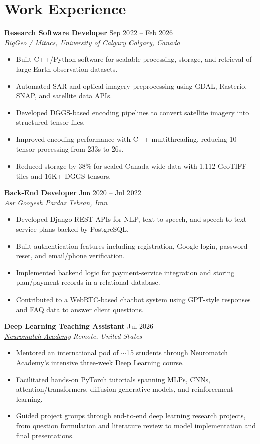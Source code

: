 \documentclass[a4paper,10pt]{article}
\newcommand{\resumeSubheading}[4]{
    \textbf{#1} \hfill #2 \\
    \textit{#3} \hfill \textit{#4}
}
\begin{document}
\section*{Work Experience}

\resumeSubheading
{Research Software Developer}
{Sep 2022 -- Feb 2026}
{\href{https://biggeo.com}{BigGeo} / \href{https://www.mitacs.ca/}{Mitacs}, University of Calgary}
{Calgary, Canada}
\begin{itemize}[leftmargin=0.25in]
    \item Built C++/Python software for scalable processing, storage, and retrieval of large Earth observation datasets.
    \item Automated SAR and optical imagery preprocessing using GDAL, Rasterio, SNAP, and satellite data APIs.
    \item Developed DGGS-based encoding pipelines to convert satellite imagery into structured tensor files.
    \item Improved encoding performance with C++ multithreading, reducing 10-tensor processing from 233s to 26s.
    \item Reduced storage by 38\% for scaled Canada-wide data with 1,112 GeoTIFF tiles and 16K+ DGGS tensors.
\end{itemize}

\resumeSubheading
{Back-End Developer}
{Jun 2020 -- Jul 2022}
{\href{https://asr-gooyesh.com/en/}{Asr Gooyesh Pardaz}}
{Tehran, Iran}
\begin{itemize}[leftmargin=0.25in]
    \item Developed Django REST APIs for NLP, text-to-speech, and speech-to-text service plans backed by PostgreSQL.
    \item Built authentication features including registration, Google login, password reset, and email/phone verification.
    \item Implemented backend logic for payment-service integration and storing plan/payment records in a relational database.
    \item Contributed to a WebRTC-based chatbot system using GPT-style responses and FAQ data to answer client questions.
\end{itemize}

\resumeSubheading
{Deep Learning Teaching Assistant}
{Jul 2026}
{\href{https://neuromatch.io/}{Neuromatch Academy}}
{Remote, United States}
\begin{itemize}[leftmargin=0.25in]
    \item Mentored an international pod of $\sim$15 students through Neuromatch Academy's intensive three-week Deep Learning course.
    \item Facilitated hands-on PyTorch tutorials spanning MLPs, CNNs, attention/transformers, diffusion generative models, and reinforcement learning.
    \item Guided project groups through end-to-end deep learning research projects, from question formulation and literature review to model implementation and final presentations.
\end{itemize}
\end{document}
